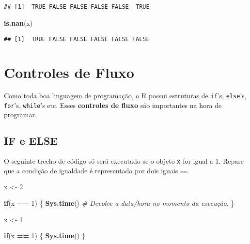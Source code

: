 \documentclass[
]{book}
\newenvironment{Shaded}{\begin{snugshade}}{\end{snugshade}}
\newcommand{\CommentTok}[1]{\textcolor[rgb]{0.56,0.35,0.01}{\textit{#1}}}
\newcommand{\ControlFlowTok}[1]{\textcolor[rgb]{0.13,0.29,0.53}{\textbf{#1}}}
\newcommand{\DecValTok}[1]{\textcolor[rgb]{0.00,0.00,0.81}{#1}}
\newcommand{\KeywordTok}[1]{\textcolor[rgb]{0.13,0.29,0.53}{\textbf{#1}}}
\newcommand{\NormalTok}[1]{#1}
\newcommand{\OperatorTok}[1]{\textcolor[rgb]{0.81,0.36,0.00}{\textbf{#1}}}
\newcommand{\StringTok}[1]{\textcolor[rgb]{0.31,0.60,0.02}{#1}}
\begin{document}
\begin{verbatim}
## [1]  TRUE FALSE FALSE FALSE FALSE  TRUE
\end{verbatim}

\begin{Shaded}
\begin{Highlighting}[]
\KeywordTok{is.nan}\NormalTok{(x)}
\end{Highlighting}
\end{Shaded}

\begin{verbatim}
## [1]  TRUE FALSE FALSE FALSE FALSE FALSE
\end{verbatim}

\hypertarget{controles-de-fluxo}{%
\section{Controles de Fluxo}\label{controles-de-fluxo}}

Como toda boa linguagem de programação, o R possui estruturas de \texttt{if}'s, \texttt{else}'s, \texttt{for}'s, \texttt{while}'s etc. Esses \textbf{controles de fluxo} são importantes na hora de programar.

\hypertarget{if-e-else}{%
\subsection{IF e ELSE}\label{if-e-else}}

O seguinte trecho de código só será executado se o objeto \texttt{x} for igual a 1. Repare que a condição de igualdade é representada por dois iguais \texttt{==}.

\begin{Shaded}
\begin{Highlighting}[]
\NormalTok{x <{-}}\StringTok{ }\DecValTok{2}

\ControlFlowTok{if}\NormalTok{(x }\OperatorTok{==}\StringTok{ }\DecValTok{1}\NormalTok{) \{         }
  \KeywordTok{Sys.time}\NormalTok{()      }\CommentTok{\# Devolve a data/hora no momento da execução.}
\NormalTok{\}}
\end{Highlighting}
\end{Shaded}

\begin{Shaded}
\begin{Highlighting}[]
\NormalTok{x <{-}}\StringTok{ }\DecValTok{1}

\ControlFlowTok{if}\NormalTok{(x }\OperatorTok{==}\StringTok{ }\DecValTok{1}\NormalTok{) \{}
  \KeywordTok{Sys.time}\NormalTok{()}
\NormalTok{\}}
\end{Highlighting}
\end{Shaded}
\end{document}
